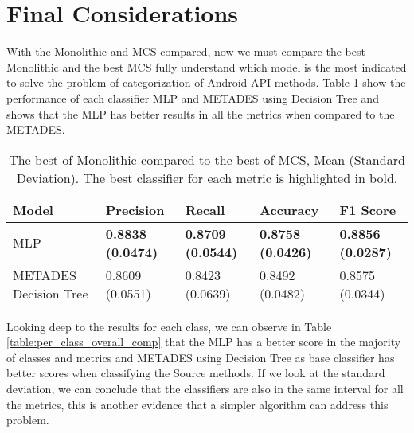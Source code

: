 \section{Final Considerations}\label{result_ending}

With the Monolithic and MCS compared, now we must compare the best Monolithic and the best MCS fully understand which model is the most indicated to solve the problem of categorization of Android API methods. Table \ref{table:overall_comp} show the performance of each classifier MLP and METADES using Decision Tree and shows that the MLP has better results in all the metrics when compared to the METADES.

\begin{table}[h!]
    \centering
    \renewcommand{\arraystretch}{1.8}
    \begin{tabular}{ p{3cm}p{2.8cm}p{2.8cm}p{2.8cm}p{2.8cm} }
        \toprule
        Model & Precision & Recall & Accuracy & F1 Score \\
        \midrule
        MLP & \textbf{0.8838 (0.0474)} & \textbf{0.8709 (0.0544)} & \textbf{0.8758 (0.0426)} & \textbf{0.8856 (0.0287)} \\
        METADES \newline Decision Tree & 0.8609 (0.0551) & 0.8423 (0.0639) & 0.8492 (0.0482) & 0.8575 (0.0344) \\
        \bottomrule
    \end{tabular}
    \caption{%
        The best of Monolithic compared to the best of MCS, Mean (Standard Deviation). The best classifier for each metric is highlighted in bold.
    }\label{table:overall_comp}
\end{table}

Looking deep to the results for each class, we can observe in Table \ref{table:per_class_overall_comp} that the MLP has a better score in the majority of classes and metrics and METADES using Decision Tree as base classifier has better scores when classifying the Source methods. If we look at the standard deviation, we can conclude that the classifiers are also in the same interval for all the metrics, this is another evidence that a simpler algorithm can address this problem.

